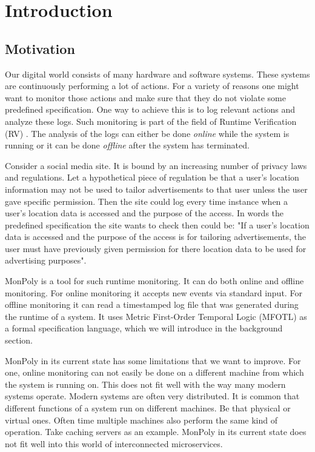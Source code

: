 \section{Introduction}

\subsection{Motivation}

Our digital world consists of many hardware and software systems.
These systems are continuously performing a lot of actions.
For a variety of reasons one might want to monitor those actions and make sure that they do not violate some predefined specification.
One way to achieve this is to log relevant actions and analyze these logs.
Such monitoring is part of the field of Runtime Verification (RV) \cite{Bartocci2018}.
The analysis of the logs can either be done \textit{online} while the system is running or it can be done \textit{offline} after the system has terminated.

Consider a social media site.
It is bound by an increasing number of privacy laws and regulations.
Let a hypothetical piece of regulation be that a user's location information may not be used to tailor advertisements to that user unless the user gave specific permission.
Then the site could log every time instance when a user's location data is accessed and the purpose of the access.
In words the predefined specification the site wants to check then could be:
    "If a user's location data is accessed and the purpose of the access is for tailoring advertisements, the user must have previously given permission for there location data to be used for advertising purposes".

MonPoly \cite{Basin2017} is a tool for such runtime monitoring.
It can do both online and offline monitoring.
For online monitoring it accepts new events via standard input.
For offline monitoring it can read a timestamped log file that was generated during the runtime of a system.
It uses Metric First-Order Temporal Logic (MFOTL) \cite{Basin2008, Basin2015, Chomicki1995} as a formal specification language, which we will introduce in the background section.

MonPoly in its current state has some limitations that we want to improve.
For one, online monitoring can not easily be done on a different machine from which the system is running on.
This does not fit well with the way many modern systems operate.
Modern systems are often very distributed.
It is common that different functions of a system run on different machines.
Be that physical or virtual ones.
Often time multiple machines also perform the same kind of operation.
Take caching servers as an example.
MonPoly in its current state does not fit well into this world of interconnected microservices.

